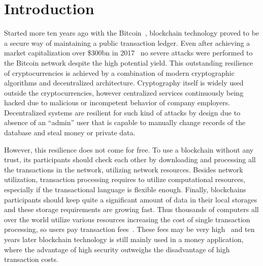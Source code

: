\section{Introduction}
\label{sec:intro}


Started more ten years ago with the Bitcoin~\cite{nakamoto2008bitcoin}, blockchain technology proved
to be a secure way of maintaining a public transaction ledger.
Even after achieving a market capitalization over \$300bn in 2017~\cite{btcPrice}
no severe attacks were performed to the Bitcoin network despite the high potential yield.
This outstanding resilience of cryptocurrencies is achieved by a combination of modern cryptographic algorithms
and decentralized architecture.
Cryptography itself is widely used outside the cryptocurrencies, however centralized services continuously
being hacked\cite{sanger2015bank,leskin2018top} due to malicious or incompetent behavior of company employers.
Decentralized systems are resilient for such kind of attacks by design due to absence of an ``admin'' user
that is capable to manually change records of the database and steal money or private data.

However, this resilience does not come for free.
To use a blockchain without any trust, its participants should check each other by downloading and
processing all the transactions in the network, utilizing network resources.
Besides network utilization, transaction processing requires to utilize computational resources,
especially if the transactional language is flexible enough.
Finally, blockchains participants should keep quite a significant amount of data in their local storages and
these storage requirements are growing fast.
Thus thousands of computers all over the world utilize various resources
increasing the cost of single transaction processing,
so users pay transaction fees~\cite{chepurnoy2018systematic}.
These fees may be very high~\cite{bitcoinFees}
and ten years later blockchain technology is still mainly used in a money application, where the advantage of
high security outweighs the disadvantage of high transaction costs.

